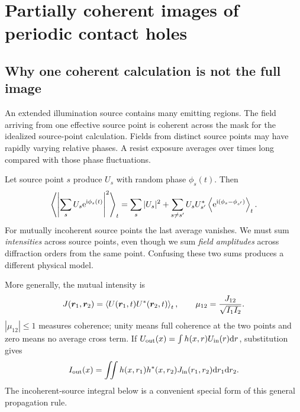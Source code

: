 \chapter{Partially coherent images of periodic contact holes}\label{ch:partial}

\section{Why one coherent calculation is not the full image}
An extended illumination source contains many emitting regions.
The field arriving from one effective source point is coherent across
the mask for the idealized source-point calculation. Fields from distinct
source points may have rapidly varying relative phases. A resist exposure
averages over times long compared with those phase fluctuations.

Let source point $s$ produce $U_s$ with random phase $\phi_s(t)$.
Then
\[
\left\langle \left|\sum_sU_s\mathrm{e}^{\mathrm{i}\phi_s(t)}\right|^2\right\rangle_t
=\sum_s|U_s|^2+
\sum_{s\ne s'}U_sU_{s'}^*
\left\langle \mathrm{e}^{\mathrm{i}(\phi_s-\phi_{s'})}\right\rangle_t.
\]
For mutually incoherent source points the last average vanishes.
We must sum \emph{intensities} across source points, even though we
sum \emph{field amplitudes} across diffraction orders from the same point.
Confusing these two sums produces a different physical model.

More generally, the mutual intensity is
\begin{equation}
J(\bm{r}_1,\bm{r}_2)
=\left\langle U(\bm{r}_1,t)U^*(\bm{r}_2,t)\right\rangle_t,
\qquad
\mu_{12}=\frac{J_{12}}{\sqrt{I_1I_2}}.
\end{equation}
$|\mu_{12}|\leq1$ measures coherence; unity means full coherence at the
two points and zero means no average cross term.
If $U_{\rm out}(x)=\int h(x,r)U_{\rm in}(r)\mathrm{d} r$, substitution gives
\[
I_{\rm out}(x)=
\iint h(x,r_1)h^*(x,r_2)J_{\rm in}(r_1,r_2)\mathrm{d} r_1\mathrm{d} r_2.
\]
The incoherent-source integral below is a convenient special form of this
general propagation rule.


